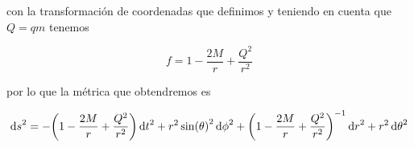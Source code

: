 \documentclass[../Main.tex]{subfiles}
\begin{document}
con la transformación de coordenadas que definimos y teniendo en cuenta que $Q=qm$ tenemos

\begin{equation}
    f=1-\dfrac{2M}{r}+\dfrac{Q^{2}}{r^{2}}
\end{equation}

por lo que la métrica que obtendremos es

\begin{equation}
    \dd{s}^{2} = -\qty(1-\dfrac{2M}{r}+\dfrac{Q^{2}}{r^{2}})\dd{t}^{2}+r^{2}\sin(\theta)^{2}\dd{\phi}^{2}+\qty(1-\dfrac{2M}{r}+\dfrac{Q^{2}}{r^{2}})^{-1}\dd{r}^{2}+r^{2}\dd{\theta}^{2}
\end{equation}






\biblio %
\end{document}
